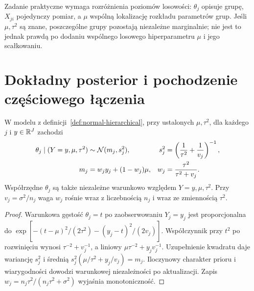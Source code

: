 Zadanie praktyczne wymaga rozróżnienia poziomów losowości:
$\theta_j$ opisuje grupę, $X_{ji}$ pojedynczy pomiar, a $\mu$
wspólną lokalizację rozkładu parametrów grup. Jeśli $\mu,\tau^2$
są znane, poszczególne grupy pozostają niezależne marginalnie;
nie jest to jednak prawdą po dodaniu wspólnego losowego hiperparametru
$\mu$ i jego scałkowaniu.

\section{Dokładny posterior i pochodzenie częściowego łączenia}
\begin{twierdzenie}
\label{thm:normal-partial-pooling}
W modelu z definicji~\ref{def:normal-hierarchical}, przy ustalonych
$\mu,\tau^2$, dla każdego $j$ i $y\in\mathbb R^J$ zachodzi
\[
\begin{aligned}
 \theta_j\mid (Y=y,\mu,\tau^2)&\sim\mathcal N(m_j,s_j^2),
 & s_j^2&=\left(\frac1{\tau^2}+\frac1{v_j}\right)^{-1},\\
 m_j&=w_jy_j+(1-w_j)\mu,
 & w_j&=\frac{\tau^2}{\tau^2+v_j}.
\end{aligned}
\]
Współrzędne $\theta_j$ są także niezależne warunkowo względem
$Y=y,\mu,\tau^2$. Przy $v_j=\sigma^2/n_j$ waga $w_j$ rośnie
wraz z liczebnością $n_j$ i wraz ze zmiennością $\tau^2$.
\end{twierdzenie}
\begin{proof}
Warunkowa gęstość $\theta_j=t$ po zaobserwowaniu $Y_j=y_j$
jest proporcjonalna do
$\exp[-(t-\mu)^2/(2\tau^2)-(y_j-t)^2/(2v_j)]$.
Współczynnik przy $t^2$ po rozwinięciu wynosi
$\tau^{-2}+v_j^{-1}$, a liniowy
$\mu\tau^{-2}+y_jv_j^{-1}$. Uzupełnienie kwadratu
daje wariancję $s_j^2$ i średnią
$s_j^2(\mu/\tau^2+y_j/v_j)=m_j$.
Iloczynowy charakter prioru i wiarygodności dowodzi
warunkowej niezależności po aktualizacji. Zapis
$w_j=n_j\tau^2/(n_j\tau^2+\sigma^2)$ wyjaśnia monotoniczność.
\end{proof}

